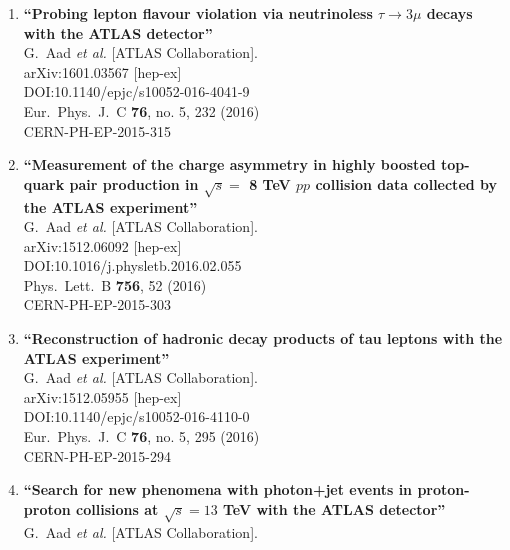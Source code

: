 \documentclass{article}
\begin{document}
\begin{enumerate}
\item%
{\bf ``Probing lepton flavour violation via neutrinoless ${\tau \longrightarrow 3\mu }$ decays with the ATLAS detector''}
  \\{}G.~Aad {\it et al.} [ATLAS Collaboration].
  \\{}arXiv:1601.03567 [hep-ex]
  \\{}DOI:10.1140/epjc/s10052-016-4041-9
  \\{}Eur.\ Phys.\ J.\ C {\bf 76}, no. 5, 232 (2016)
  \\{}CERN-PH-EP-2015-315
\item%
{\bf ``Measurement of the charge asymmetry in highly boosted top-quark pair production in $\sqrt{s} =$ 8 TeV $pp$ collision data collected by the ATLAS experiment''}
  \\{}G.~Aad {\it et al.} [ATLAS Collaboration].
  \\{}arXiv:1512.06092 [hep-ex]
  \\{}DOI:10.1016/j.physletb.2016.02.055
  \\{}Phys.\ Lett.\ B {\bf 756}, 52 (2016)
  \\{}CERN-PH-EP-2015-303
\item%
{\bf ``Reconstruction of hadronic decay products of tau leptons with the ATLAS experiment''}
  \\{}G.~Aad {\it et al.} [ATLAS Collaboration].
  \\{}arXiv:1512.05955 [hep-ex]
  \\{}DOI:10.1140/epjc/s10052-016-4110-0
  \\{}Eur.\ Phys.\ J.\ C {\bf 76}, no. 5, 295 (2016)
  \\{}CERN-PH-EP-2015-294
\item%
{\bf ``Search for new phenomena with photon+jet events in proton-proton collisions at $ \sqrt{s}=13 $ TeV with the ATLAS detector''}
  \\{}G.~Aad {\it et al.} [ATLAS Collaboration].

\end{enumerate}
\end{document}
